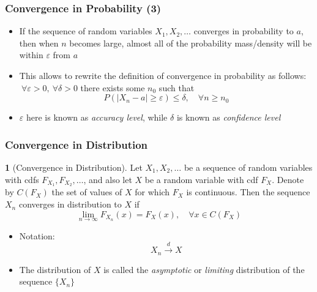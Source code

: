 \documentclass[10pt]{beamer}
\theoremstyle{definition}
\newtheorem{definition}{\translate{Definition}}
\begin{document}
\begin{frame}[fragile]
	\frametitle{Convergence in Probability (3)}
	\begin{itemize}
		\item If the sequence of random variables $ X_{1}, X_{2}, \ldots $ converges in probability to $ a $, then when $ n $ becomes large, almost all of the probability mass/density will be within $ \varepsilon $ from $ a $
		
		\item This allows to rewrite the definition of convergence in probability as follows: $ \ \forall \varepsilon > 0, \ \forall \delta > 0 $ there exists some $ n_{0}  $ such that
		\[
			P(|X_{n} - a| \geq \varepsilon) \leq \delta,\quad \forall n \geq n_{0}
		\]
		
		\item $ \varepsilon $ here is known as \textit{accuracy level}, while $ \delta $ is known as \textit{confidence level}
	\end{itemize}
\end{frame}

\begin{frame}[fragile]
	\frametitle{Convergence in Distribution}
	\begin{definition}[Convergence in Distribution]
		Let $ X_{1}, X_{2}, \ldots $ be a sequence of random variables with cdfs $ F_{X_{1}}, F_{X_{2}},\ldots $, and also let $ X $ be a random variable with cdf $ F_{X} $. Denote by $ C(F_{X}) $ the set of values of $ X $ for which $ F_{X} $ is continuous. Then the sequence $ X_{n} $ converges in distribution to $ X $ if
		\[
			\lim_{n\to\infty}F_{X_{n}}(x) = F_{X}(x),\quad \forall x \in C(F_{X})
		\]
	\end{definition}
	\begin{itemize}
		\item Notation:
		\[
			X_{n} \overset{d}{\to} X
		\]
		
		\item The distribution of $ X $ is called the \textit{asymptotic} or \textit{limiting} distribution of the sequence $ \{X_{n}\} $
	\end{itemize}
\end{frame}
\end{document}
